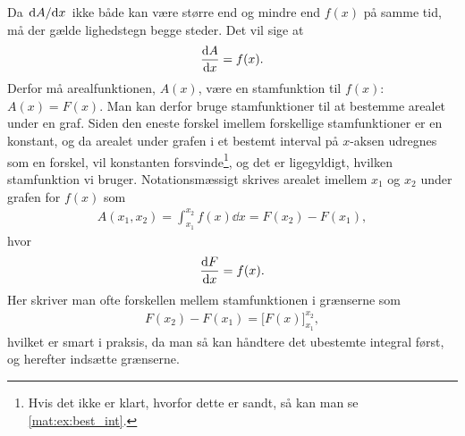 %
Da $\dv*{A}{x}$ ikke både kan være større end og mindre end $f(x)$ på samme tid, må der gælde lighedstegn begge steder. Det vil sige at
%
\begin{align}
    \dv{A}{x} = f(x).
\end{align}
%
Derfor må arealfunktionen, $A(x)$, være en stamfunktion til $f(x)$: $A(x) = F(x)$. Man kan derfor bruge stamfunktioner til at bestemme arealet under en graf. Siden den eneste forskel imellem forskellige stamfunktioner er en konstant, og da arealet under grafen i et bestemt interval på $x$-aksen udregnes som en forskel, vil konstanten forsvinde\footnote{Hvis det ikke er klart, hvorfor dette er sandt, så kan man se \cref{mat:ex:best_int}.}, og det er ligegyldigt, hvilken stamfunktion vi bruger.
Notationsmæssigt skrives arealet imellem $x_1$ og $x_2$ under grafen for $f(x)$ som
%
\begin{align} \label{mat:eq:best_int}
    A(x_1,x_2) = \int_{x_1}^{x_2}f(x)\dd{x} = F(x_2)-F(x_1),
\end{align}
%
hvor
%
\begin{align}
    \dv{F}{x} = f(x).
\end{align}
%
Her skriver man ofte forskellen mellem stamfunktionen i grænserne som
%
\begin{align} \label{mat:eq:klammestamfunktion}
    F(x_2)-F(x_1) = \Big[F(x)\Big]_{x_1}^{x_2},
\end{align}
%
hvilket er smart i praksis, da man så kan håndtere det ubestemte integral først, og herefter indsætte grænserne.

